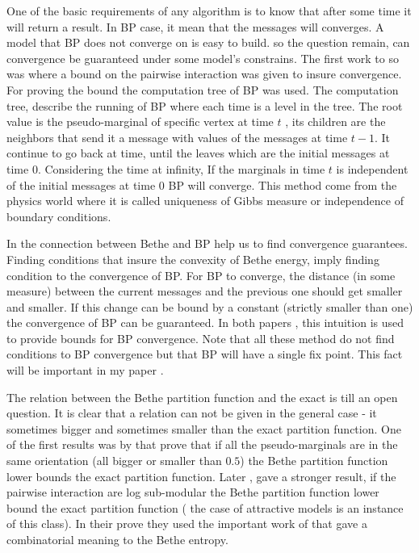 One of the basic requirements of any algorithm is to know that after some time it will return a result.
In BP case, it mean that the messages will converges.
A model that BP does not converge on is easy to build.
so the question remain, can convergence be guaranteed under some model's constrains.
The first work to so was \cite{tatikonda2002loopy} where a bound on the pairwise interaction was given to insure convergence.
For proving the bound the computation tree of BP was used.
The computation tree, describe the running of BP where each time is a level in the tree.
The root value is the pseudo-marginal of specific vertex at time $t$ , its children are the neighbors that send it a message with values of the messages at time $t-1$.
It continue to go back at time, until the leaves which are the initial messages at time $0$.
Considering the time at infinity, If the marginals in time $t$ is independent of the initial messages at time $0$ BP will converge.
This method come from the physics world where it is called uniqueness of Gibbs measure or independence of boundary conditions.

In \cite{heskes2004uniqueness} the connection between Bethe and BP help us to find convergence guarantees.
Finding conditions that insure the convexity of Bethe energy, imply finding condition to the convergence of BP. 
For BP to converge,  the distance (in some measure) between the current messages and the previous one should get smaller and smaller.
If this change can be bound by a constant (strictly smaller than one) the convergence of BP can be guaranteed.
In both papers \cite{mooij2007sufficient}, \cite{roosta2008convergence} this intuition is used to provide bounds for BP convergence.
Note that all these method do not find conditions to BP convergence but that BP will have a single fix point.
This fact will be important in my paper \cite{heinemann2012cannot}.

The relation between the Bethe partition function and the exact is till an open question.
It is clear that a relation can not be given in the general case - it sometimes bigger and sometimes smaller than the exact partition function.
One of the first results was by \cite{AlanNips2007} that prove that if all the pseudo-marginals are in the same orientation (all bigger or smaller than $0.5$) the Bethe partition function lower bounds the exact partition function.
Later \cite{RuozziNips2012},  gave a stronger result, if the pairwise interaction are log sub-modular the Bethe partition function lower bound the exact partition function ( the case of attractive models is an instance of this class).
In their prove they used the important work of \cite{vontobel2013counting} that gave a combinatorial meaning to the Bethe entropy.

